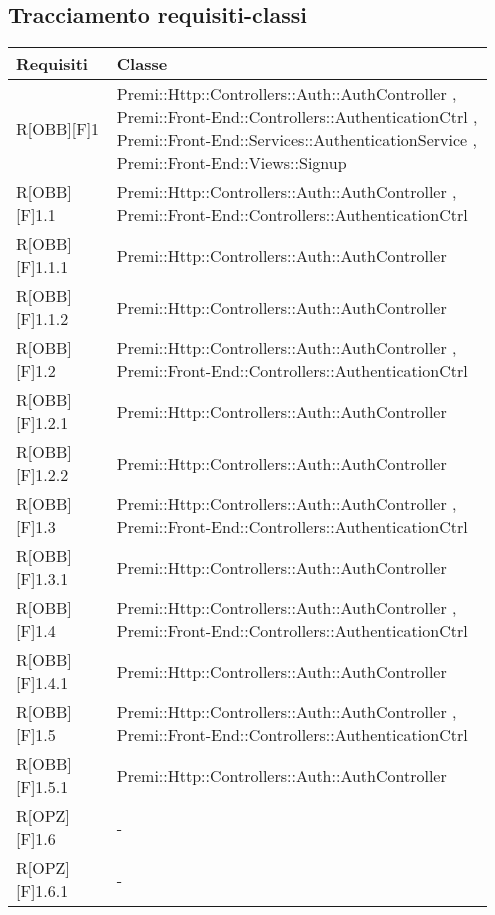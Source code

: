 \newpage
\subsection{Tracciamento requisiti-classi}
\begin{table}[h]
	\begin{center}
		\begin{tabular}{|p{0.2\linewidth}|p{0.75\linewidth}|}
			\toprule
			\textbf{Requisiti} & \textbf{Classe}\\
		\midrule
			R[OBB][F]1 & Premi::Http::Controllers::Auth::AuthController , Premi::Front-End::Controllers::AuthenticationCtrl , Premi::Front-End::Services::AuthenticationService , Premi::Front-End::Views::Signup\\
		\midrule
			R[OBB][F]1.1 & Premi::Http::Controllers::Auth::AuthController , Premi::Front-End::Controllers::AuthenticationCtrl\\
		\midrule
			R[OBB][F]1.1.1 & Premi::Http::Controllers::Auth::AuthController\\
		\midrule
			R[OBB][F]1.1.2 & Premi::Http::Controllers::Auth::AuthController\\
		\midrule
			R[OBB][F]1.2 & Premi::Http::Controllers::Auth::AuthController , Premi::Front-End::Controllers::AuthenticationCtrl\\
		\midrule
			R[OBB][F]1.2.1 & Premi::Http::Controllers::Auth::AuthController\\
		\midrule
			R[OBB][F]1.2.2 & Premi::Http::Controllers::Auth::AuthController\\
		\midrule
			R[OBB][F]1.3 & Premi::Http::Controllers::Auth::AuthController , Premi::Front-End::Controllers::AuthenticationCtrl\\
		\midrule
			R[OBB][F]1.3.1 & Premi::Http::Controllers::Auth::AuthController\\
		\midrule
			R[OBB][F]1.4 & Premi::Http::Controllers::Auth::AuthController , Premi::Front-End::Controllers::AuthenticationCtrl\\
		\midrule
			R[OBB][F]1.4.1 & Premi::Http::Controllers::Auth::AuthController\\
		\midrule
			R[OBB][F]1.5 & Premi::Http::Controllers::Auth::AuthController , Premi::Front-End::Controllers::AuthenticationCtrl\\
		\midrule
			R[OBB][F]1.5.1 & Premi::Http::Controllers::Auth::AuthController\\
		\midrule
			R[OPZ][F]1.6 & -\\
		\midrule
			R[OPZ][F]1.6.1 & -\\

\end{tabular}
\end{center}
\end{table}

